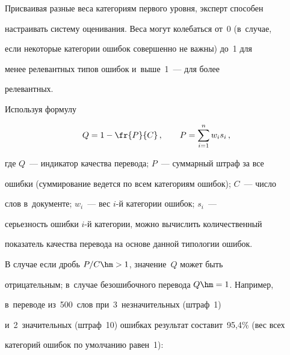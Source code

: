   Присваивая разные веса категориям первого уровня, эксперт способен 

настраивать систему оценивания. Веса могут колебаться от~0 (в~случае, 

если некоторые категории ошибок совершенно не важны) до~1 для 

менее релевантных типов ошибок и~выше~1~--- для более 

релевантных.

  

  Используя формулу 

  

\vspace*{-2pt}

  

  \noindent

  $$

  Q=1-\fr{P}{C}\,,\qquad P=\sum\limits^n_{i=1} w_i s_i\,,

  $$

  

  \vspace*{-2pt}

  

  \noindent

где $Q$~--- индикатор качества перевода; $P$~--- суммарный штраф за все 

ошибки (суммирование ведется по всем категориям ошибок); $C$~--- число 

слов в~документе; $w_i$~--- вес $i$-й категории ошибок; $s_i$~--- 

серьезность ошибки $i$-й категории, можно вычислить количественный 

показатель качества перевода на основе данной типологии ошибок. 



В случае если дробь $P/C\hm >1$, значение~$Q$ может быть 

отрицательным; в~случае безошибочного перевода $Q\hm= 1$. Например, 

в~переводе из~500~слов при~3~незначительных (штраф~1) 

и~2~значительных (штраф~10) ошибках результат составит~95,4\% (вес всех 

категорий ошибок по умолчанию равен~1):



\vspace*{4pt}



\noindent

$$

